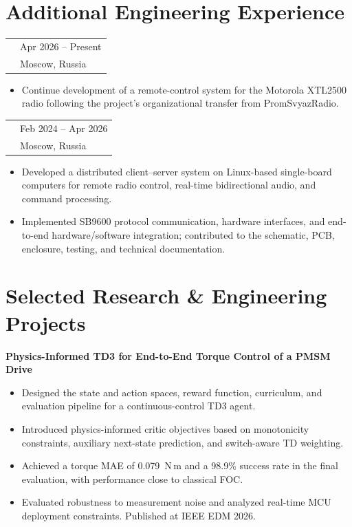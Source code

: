 \documentclass[10pt,a4paper]{article}
\makeatletter
\newcommand{\cvrole}[4]{%
  \begin{tabularx}{\textwidth}{@{}>{\raggedright\arraybackslash}X
    >{\raggedleft\arraybackslash}p{0.27\textwidth}@{}}
    {\sffamily\bfseries #1} & {\small\color{textgray}#4} \\
    {\itshape #2} & {\small\color{lightgray}#3}
  \end{tabularx}
  \vspace{0.12em}
}
\newcommand{\project}[2]{%
  \needspace{3\baselineskip}
  {\sffamily\bfseries #1}\par
  \vspace{0.12em}
  #2
}
\makeatother
\begin{document}
\newpage

\section{Additional Engineering Experience}

\cvrole{TIENDA LLC}
       {Engineer, Technical Department}
       {Moscow, Russia}{Apr 2026 -- Present}
\begin{itemize}
  \item Continue development of a remote-control system for the Motorola XTL2500
        radio following the project's organizational transfer from PromSvyazRadio.
\end{itemize}

\vspace{0.3em}
\cvrole{PromSvyazRadio LLC}
       {Assistant to the Chief Engineer, Technical Department}
       {Moscow, Russia}{Feb 2024 -- Apr 2026}
\begin{itemize}
  \item Developed a distributed client--server system on Linux-based single-board
        computers for remote radio control, real-time bidirectional audio, and
        command processing.
  \item Implemented SB9600 protocol communication, hardware interfaces, and
        end-to-end hardware/software integration; contributed to the schematic,
        PCB, enclosure, testing, and technical documentation.
\end{itemize}

\section{Selected Research \& Engineering Projects}

\project{Physics-Informed TD3 for End-to-End Torque Control of a PMSM Drive}{
  \begin{itemize}
    \item Designed the state and action spaces, reward function, curriculum, and
          evaluation pipeline for a continuous-control TD3 agent.
    \item Introduced physics-informed critic objectives based on monotonicity
          constraints, auxiliary next-state prediction, and switch-aware TD weighting.
    \item Achieved a torque MAE of 0.079~N\,m and a 98.9\% success rate in the
          final evaluation, with performance close to classical FOC.
    \item Evaluated robustness to measurement noise and analyzed real-time MCU
          deployment constraints. Published at IEEE EDM 2026.
  \end{itemize}
}
\end{document}
